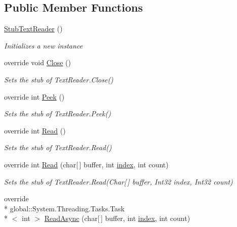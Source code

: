 \subsection*{Public Member Functions}
\begin{DoxyCompactItemize}
\item 
\hyperlink{class_system_1_1_i_o_1_1_fakes_1_1_stub_text_reader_a162c32ea117be252e830aeee8e6fc83b}{Stub\-Text\-Reader} ()
\begin{DoxyCompactList}\small\item\em Initializes a new instance\end{DoxyCompactList}\item 
override void \hyperlink{class_system_1_1_i_o_1_1_fakes_1_1_stub_text_reader_a4f361025dd4de5f1a01e64626ea09a26}{Close} ()
\begin{DoxyCompactList}\small\item\em Sets the stub of Text\-Reader.\-Close()\end{DoxyCompactList}\item 
override int \hyperlink{class_system_1_1_i_o_1_1_fakes_1_1_stub_text_reader_aa5b25a0a855f7dd84869a31c0aa6cd3f}{Peek} ()
\begin{DoxyCompactList}\small\item\em Sets the stub of Text\-Reader.\-Peek()\end{DoxyCompactList}\item 
override int \hyperlink{class_system_1_1_i_o_1_1_fakes_1_1_stub_text_reader_afb1f27f1b0178a8bbc7d119c93be06f0}{Read} ()
\begin{DoxyCompactList}\small\item\em Sets the stub of Text\-Reader.\-Read()\end{DoxyCompactList}\item 
override int \hyperlink{class_system_1_1_i_o_1_1_fakes_1_1_stub_text_reader_a152ea9bf34af6c6dc48b1a6133e0d7ef}{Read} (char\mbox{[}$\,$\mbox{]} buffer, int \hyperlink{jquery-1_810_82-vsdoc_8js_a75bb12d1f23302a9eea93a6d89d0193e}{index}, int count)
\begin{DoxyCompactList}\small\item\em Sets the stub of Text\-Reader.\-Read(\-Char\mbox{[}$\,$\mbox{]} buffer, Int32 index, Int32 count)\end{DoxyCompactList}\item 
override \\*
global\-::\-System.\-Threading.\-Tasks.\-Task\\*
$<$ int $>$ \hyperlink{class_system_1_1_i_o_1_1_fakes_1_1_stub_text_reader_a08aaf04fbe51b2e0b556bcdc7bb57000}{Read\-Async} (char\mbox{[}$\,$\mbox{]} buffer, int \hyperlink{jquery-1_810_82-vsdoc_8js_a75bb12d1f23302a9eea93a6d89d0193e}{index}, int count)

\end{DoxyCompactItemize}
